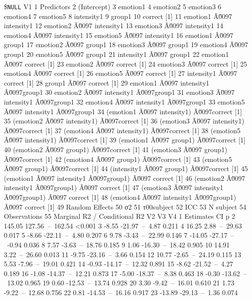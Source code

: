 \documentclass[
]{article}
\begin{document}
\$\texttt{NULL}
V1
1 Predictors
2 (Intercept)
3 emotion1
4 emotion2
5 emotion3
6 emotion4
7 emotion5
8 intensity1
9 group1
10 correct {[}1{]}
11 emotion1 Ã\u0097 intensity1
12 emotion2 Ã\u0097 intensity1
13 emotion3 Ã\u0097 intensity1
14 emotion4 Ã\u0097 intensity1
15 emotion5 Ã\u0097 intensity1
16 emotion1 Ã\u0097 group1
17 emotion2 Ã\u0097 group1
18 emotion3 Ã\u0097 group1
19 emotion4 Ã\u0097 group1
20 emotion5 Ã\u0097 group1
21 intensity1 Ã\u0097 group1
22 emotion1 Ã\u0097 correct {[}1{]}
23 emotion2 Ã\u0097 correct {[}1{]}
24 emotion3 Ã\u0097 correct {[}1{]}
25 emotion4 Ã\u0097 correct {[}1{]}
26 emotion5 Ã\u0097 correct {[}1{]}
27 intensity1 Ã\u0097 correct {[}1{]}
28 group1 Ã\u0097 correct {[}1{]}
29 emotion1 Ã\u0097 intensity1 Ã\u0097group1
30 emotion2 Ã\u0097 intensity1 Ã\u0097group1
31 emotion3 Ã\u0097 intensity1 Ã\u0097group1
32 emotion4 Ã\u0097 intensity1 Ã\u0097group1
33 emotion5 Ã\u0097 intensity1 Ã\u0097group1
34 (emotion1 Ã\u0097 intensity1) Ã\u0097correct {[}1{]}
35 (emotion2 Ã\u0097 intensity1) Ã\u0097correct {[}1{]}
36 (emotion3 Ã\u0097 intensity1) Ã\u0097correct {[}1{]}
37 (emotion4 Ã\u0097 intensity1) Ã\u0097correct {[}1{]}
38 (emotion5 Ã\u0097 intensity1) Ã\u0097correct {[}1{]}
39 (emotion1 Ã\u0097 group1) Ã\u0097correct {[}1{]}
40 (emotion2 Ã\u0097 group1) Ã\u0097correct {[}1{]}
41 (emotion3 Ã\u0097 group1) Ã\u0097correct {[}1{]}
42 (emotion4 Ã\u0097 group1) Ã\u0097correct {[}1{]}
43 (emotion5 Ã\u0097 group1) Ã\u0097correct {[}1{]}
44 (intensity1 Ã\u0097 group1) Ã\u0097correct {[}1{]}
45 (emotion1 Ã\u0097 intensity1 Ã\u0097group1) Ã\u0097 correct {[}1{]}
46 (emotion2 Ã\u0097 intensity1 Ã\u0097group1) Ã\u0097 correct {[}1{]}
47 (emotion3 Ã\u0097 intensity1 Ã\u0097group1) Ã\u0097 correct {[}1{]}
48 (emotion4 Ã\u0097 intensity1 Ã\u0097group1) Ã\u0097 correct {[}1{]}
49 Random Effects
50 σ2
51 τ00subject
52 ICC
53 N subject
54 Observations
55 Marginal R2 / Conditional R2
V2 V3 V4
1 Estimates CI p
2 145.05 127.56~--~162.54 \textless0.001
3 -8.55 -21.97~--~4.87 0.211
4 16.25 2.88~--~29.63 0.017
5 -8.66 -22.11~--~4.80 0.207
6 9.78 -3.43~--~22.99 0.146
7 -14.05 -27.17~--~-0.94 0.036
8 7.57 -3.63~--~18.76 0.185
9 1.06 -16.30~--~18.42 0.905
10 14.91 3.22~--~26.60 0.013
11 -9.75 -23.16~--~3.66 0.154
12 10.77 -2.65~--~24.19 0.115
13 5.53 -7.96~--~19.01 0.421
14 -0.93 -14.17~--~12.32 0.891
15 -8.62 -21.52~--~4.27 0.189
16 -1.08 -14.37~--~12.21 0.873
17 -5.00 -18.37~--~8.38 0.463
18 -0.30 -13.62~--~13.02 0.965
19 0.60 -12.53~--~13.74 0.928
20 3.30 -9.42~--~16.01 0.610
21 1.73 -9.22~--~12.68 0.756
22 0.81 -14.53~--~16.16 0.917
23 -13.89 -29.13~--~1.36 0.074
\end{document}
